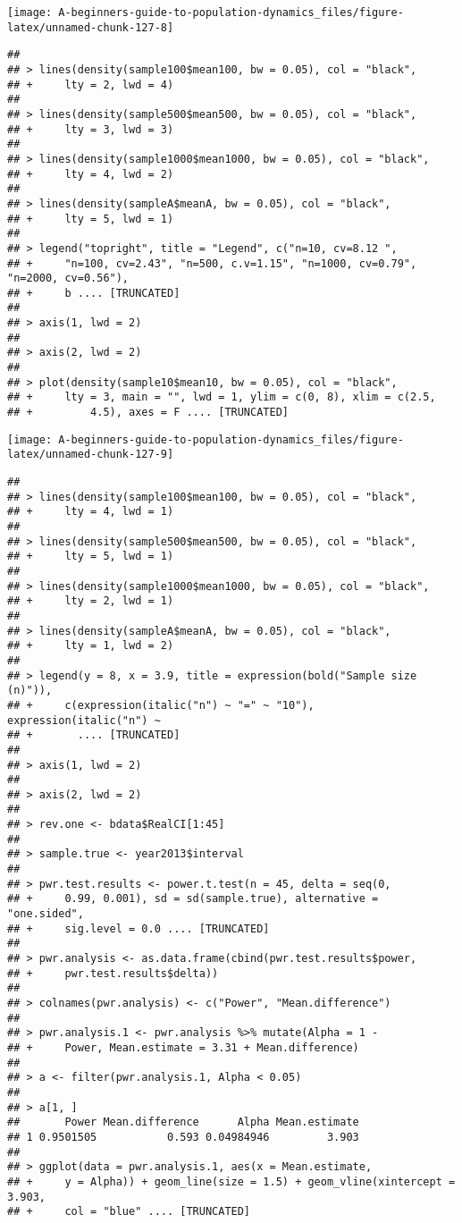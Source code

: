 \documentclass[]{book}
\begin{document}
\begin{center}\texttt{[image: A-beginners-guide-to-population-dynamics\_files/figure-latex/unnamed-chunk-127-8]} \end{center}

\begin{verbatim}
## 
## > lines(density(sample100$mean100, bw = 0.05), col = "black", 
## +     lty = 2, lwd = 4)
## 
## > lines(density(sample500$mean500, bw = 0.05), col = "black", 
## +     lty = 3, lwd = 3)
## 
## > lines(density(sample1000$mean1000, bw = 0.05), col = "black", 
## +     lty = 4, lwd = 2)
## 
## > lines(density(sampleA$meanA, bw = 0.05), col = "black", 
## +     lty = 5, lwd = 1)
## 
## > legend("topright", title = "Legend", c("n=10, cv=8.12 ", 
## +     "n=100, cv=2.43", "n=500, c.v=1.15", "n=1000, cv=0.79", "n=2000, cv=0.56"), 
## +     b .... [TRUNCATED] 
## 
## > axis(1, lwd = 2)
## 
## > axis(2, lwd = 2)
## 
## > plot(density(sample10$mean10, bw = 0.05), col = "black", 
## +     lty = 3, main = "", lwd = 1, ylim = c(0, 8), xlim = c(2.5, 
## +         4.5), axes = F .... [TRUNCATED]
\end{verbatim}

\begin{center}\texttt{[image: A-beginners-guide-to-population-dynamics\_files/figure-latex/unnamed-chunk-127-9]} \end{center}

\begin{verbatim}
## 
## > lines(density(sample100$mean100, bw = 0.05), col = "black", 
## +     lty = 4, lwd = 1)
## 
## > lines(density(sample500$mean500, bw = 0.05), col = "black", 
## +     lty = 5, lwd = 1)
## 
## > lines(density(sample1000$mean1000, bw = 0.05), col = "black", 
## +     lty = 2, lwd = 1)
## 
## > lines(density(sampleA$meanA, bw = 0.05), col = "black", 
## +     lty = 1, lwd = 2)
## 
## > legend(y = 8, x = 3.9, title = expression(bold("Sample size (n)")), 
## +     c(expression(italic("n") ~ "=" ~ "10"), expression(italic("n") ~ 
## +       .... [TRUNCATED] 
## 
## > axis(1, lwd = 2)
## 
## > axis(2, lwd = 2)
## 
## > rev.one <- bdata$RealCI[1:45]
## 
## > sample.true <- year2013$interval
## 
## > pwr.test.results <- power.t.test(n = 45, delta = seq(0, 
## +     0.99, 0.001), sd = sd(sample.true), alternative = "one.sided", 
## +     sig.level = 0.0 .... [TRUNCATED] 
## 
## > pwr.analysis <- as.data.frame(cbind(pwr.test.results$power, 
## +     pwr.test.results$delta))
## 
## > colnames(pwr.analysis) <- c("Power", "Mean.difference")
## 
## > pwr.analysis.1 <- pwr.analysis %>% mutate(Alpha = 1 - 
## +     Power, Mean.estimate = 3.31 + Mean.difference)
## 
## > a <- filter(pwr.analysis.1, Alpha < 0.05)
## 
## > a[1, ]
##       Power Mean.difference      Alpha Mean.estimate
## 1 0.9501505           0.593 0.04984946         3.903
## 
## > ggplot(data = pwr.analysis.1, aes(x = Mean.estimate, 
## +     y = Alpha)) + geom_line(size = 1.5) + geom_vline(xintercept = 3.903, 
## +     col = "blue" .... [TRUNCATED]
\end{verbatim}
\end{document}
